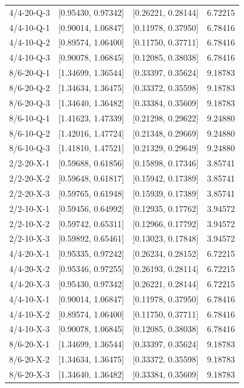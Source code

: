 \begin{longtable}{lccr}
4/4-20-Q-3 & [0.95430, 0.97342] & [0.26221, 0.28144] & 6.72215 \\
4/4-10-Q-1 & [0.90014, 1.06847] & [0.11978, 0.37950] & 6.78416 \\
4/4-10-Q-2 & [0.89574, 1.06400] & [0.11750, 0.37711] & 6.78416 \\
4/4-10-Q-3 & [0.90078, 1.06845] & [0.12085, 0.38038] & 6.78416 \\
8/6-20-Q-1 & [1.34699, 1.36544] & [0.33397, 0.35624] & 9.18783 \\
8/6-20-Q-2 & [1.34634, 1.36475] & [0.33372, 0.35598] & 9.18783 \\
8/6-20-Q-3 & [1.34640, 1.36482] & [0.33384, 0.35609] & 9.18783 \\
8/6-10-Q-1 & [1.41623, 1.47339] & [0.21298, 0.29622] & 9.24880 \\
8/6-10-Q-2 & [1.42016, 1.47724] & [0.21348, 0.29669] & 9.24880 \\
8/6-10-Q-3 & [1.41810, 1.47521] & [0.21329, 0.29649] & 9.24880 \\
2/2-20-X-1 & [0.59688, 0.61856] & [0.15898, 0.17346] & 3.85741 \\
2/2-20-X-2 & [0.59648, 0.61817] & [0.15942, 0.17389] & 3.85741 \\
2/2-20-X-3 & [0.59765, 0.61948] & [0.15939, 0.17389] & 3.85741 \\
2/2-10-X-1 & [0.59456, 0.64992] & [0.12935, 0.17762] & 3.94572 \\
2/2-10-X-2 & [0.59742, 0.65311] & [0.12966, 0.17792] & 3.94572 \\
2/2-10-X-3 & [0.59892, 0.65461] & [0.13023, 0.17848] & 3.94572 \\
4/4-20-X-1 & [0.95335, 0.97242] & [0.26234, 0.28152] & 6.72215 \\
4/4-20-X-2 & [0.95346, 0.97255] & [0.26193, 0.28114] & 6.72215 \\
4/4-20-X-3 & [0.95430, 0.97342] & [0.26221, 0.28144] & 6.72215 \\
4/4-10-X-1 & [0.90014, 1.06847] & [0.11978, 0.37950] & 6.78416 \\
4/4-10-X-2 & [0.89574, 1.06400] & [0.11750, 0.37711] & 6.78416 \\
4/4-10-X-3 & [0.90078, 1.06845] & [0.12085, 0.38038] & 6.78416 \\
8/6-20-X-1 & [1.34699, 1.36544] & [0.33397, 0.35624] & 9.18783 \\
8/6-20-X-2 & [1.34634, 1.36475] & [0.33372, 0.35598] & 9.18783 \\
8/6-20-X-3 & [1.34640, 1.36482] & [0.33384, 0.35609] & 9.18783 \\

\end{longtable}
